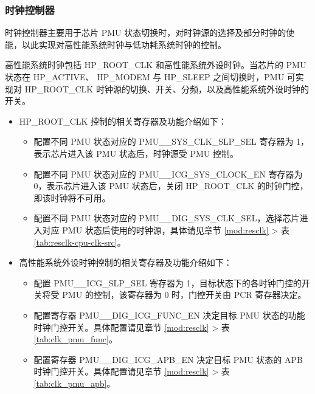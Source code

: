 \documentclass[main\_\_CN.tex]{subfiles}
\begin{document}
\subsubsection{时钟控制器}

时钟控制器主要用于芯片 PMU 状态切换时，对时钟源的选择及部分时钟的使能，以此实现对高性能系统时钟与低功耗系统时钟的控制。

高性能系统时钟包括 HP\_ROOT\_CLK 和高性能系统外设时钟。当芯片的 PMU 状态在 HP\_ACTIVE、 HP\_MODEM 与 HP\_SLEEP 之间切换时，PMU 可实现对 HP\_ROOT\_CLK 时钟源的切换、开关、分频，以及高性能系统外设时钟的开关。


\begin{itemize}

\item HP\_ROOT\_CLK 控制的相关寄存器及功能介绍如下：

    \begin{itemize}
    \item 配置不同 PMU 状态对应的 PMU\_\_SYS\_CLK\_SLP\_SEL 寄存器为 1，表示芯片进入该 PMU 状态后，时钟源受 PMU 控制。

    \item 配置不同 PMU 状态对应的 PMU\_\_ICG\_SYS\_CLOCK\_EN 寄存器为 0，表示芯片进入该 PMU 状态后，关闭 HP\_ROOT\_CLK 的时钟门控，即该时钟将不可用。

    \item 配置不同 PMU 状态对应的 PMU\_\_DIG\_SYS\_CLK\_SEL，选择芯片进入对应 PMU 状态后使用的时钟源，具体请见章节 \ref{mod:resclk} \textit{} > 表 \ref{tab:resclk-cpu-clk-src}。
    \end{itemize}

\item 高性能系统外设时钟控制的相关寄存器及功能介绍如下：

    \begin{itemize}
    \item 配置 PMU\_\_ICG\_SLP\_SEL 寄存器为 1，目标状态下的各时钟门控的开关将受 PMU 的控制，该寄存器为 0 时，门控开关由 PCR 寄存器决定。

    \item 配置寄存器 PMU\_\_DIG\_ICG\_FUNC\_EN 决定目标 PMU 状态的功能时钟门控开关。具体配置请见章节 \ref{mod:resclk} \textit{} > 表 \ref{tab:clk_pmu_func}。

    \item 配置寄存器 PMU\_\_DIG\_ICG\_APB\_EN 决定目标 PMU 状态的 APB 时钟门控开关。具体配置请见章节 \ref{mod:resclk} \textit{} > 表 \ref{tab:clk_pmu_apb}。
    \end{itemize}

\end{itemize}
\end{document}
